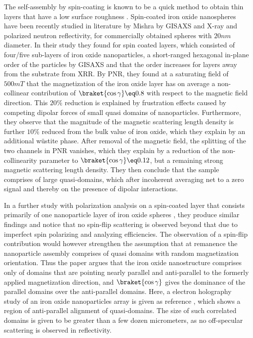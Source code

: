 \documentclass[\main/dresen_thesis.tex]{subfiles}
\begin{document}
  The self-assembly by spin-coating is known to be a quick method to obtain thin layers that have a low surface roughness \cite{Xu_2012_Trans}.
  Spin-coated iron oxide nanospheres have been recently studied in literature by Mishra \etal \cite{Mishra_2012_Selfa} by GISAXS and X-ray and polarized neutron reflectivity, for commercially obtained spheres with $20 \unit{nm}$ diameter.
  In their study they found for spin coated layers, which consisted of four/five sub-layers of iron oxide nanoparticles, a short-ranged hexagonal in-plane order of the particles by GISAXS and that the order increases for layers away from the substrate from XRR.
  By PNR, they found at a saturating field of $500 \unit{mT}$ that the magnetization of the iron oxide layer has on average a non-collinear contribution of $\braket{\cos{\gamma}} \eq 0.8$ with respect to the magnetic field direction.
  This $20 \%$ reduction is explained by frustration effects caused by competing dipolar forces of small quasi domains of nanoparticles.
  Furthermore, they observe that the magnitude of the magnetic scattering length density is further $10 \%$ reduced from the bulk value of iron oxide, which they explain by an additional w\"ustite phase.
  After removal of the magnetic field, the splitting of the two channels in PNR vanishes, which they explain by a reduction of the non-collinearity parameter to $\braket{\cos{\gamma}} \eq 0.12$, but a remaining strong magnetic scattering length density.
  They then conclude that the sample comprises of large quasi-domains, which after incoherent averaging net to a zero signal and thereby on the presence of dipolar interactions.

  In a further study with polarization analysis on a spin-coated layer that consists primarily of one nanoparticle layer of iron oxide spheres \cite{Mishra_2015_Polar}, they produce similar findings and notice that no spin-flip scattering is observed beyond that due to imperfect spin polarizing and analyzing efficiencies.
  The observation of a spin-flip contribution would however strengthen the assumption that at remanence the nanoparticle assembly comprises of quasi domains with random magnetization orientation.
  Thus the paper argues that the iron oxide nanostructure comprises only of domains that are pointing nearly parallel and anti-parallel to the formerly applied magnetization direction, and $\braket{\cos{\gamma}}$ gives the dominance of the parallel domains over the anti-parallel domains.
  Here, a electron holography study of an iron oxide nanoparticles array is given as reference \cite{Yamamoto_2011_Dipol}, which shows a region of anti-parallel alignment of quasi-domains.
  The size of such correlated domains is given to be greater than a few dozen micrometers, as no off-specular scattering is observed in reflectivity.
\end{document}

